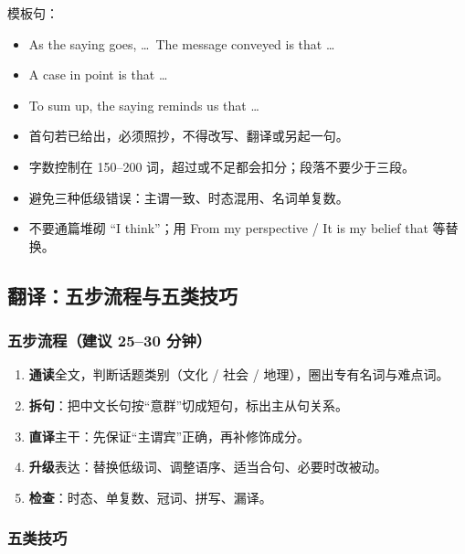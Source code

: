 模板句：
\begin{itemize}
  \item As the saying goes, \ldots\ The message conveyed is that \ldots
  \item A case in point is that \ldots
  \item To sum up, the saying reminds us that \ldots
\end{itemize}

\begin{notebox}[避坑清单]
\begin{itemize}
  \item 首句若已给出，必须照抄，不得改写、翻译或另起一句。
  \item 字数控制在 150--200 词，超过或不足都会扣分；段落不要少于三段。
  \item 避免三种低级错误：主谓一致、时态混用、名词单复数。
  \item 不要通篇堆砌 “I think”；用 From my perspective / It is my belief that 等替换。
\end{itemize}
\end{notebox}

\subsection{翻译：五步流程与五类技巧}

\subsubsection*{五步流程（建议 25--30 分钟）}

\begin{enumerate}
  \item \textbf{通读}全文，判断话题类别（文化 / 社会 / 地理），圈出专有名词与难点词。
  \item \textbf{拆句}：把中文长句按“意群”切成短句，标出主从句关系。
  \item \textbf{直译}主干：先保证“主谓宾”正确，再补修饰成分。
  \item \textbf{升级}表达：替换低级词、调整语序、适当合句、必要时改被动。
  \item \textbf{检查}：时态、单复数、冠词、拼写、漏译。
\end{enumerate}

\subsubsection*{五类技巧}

